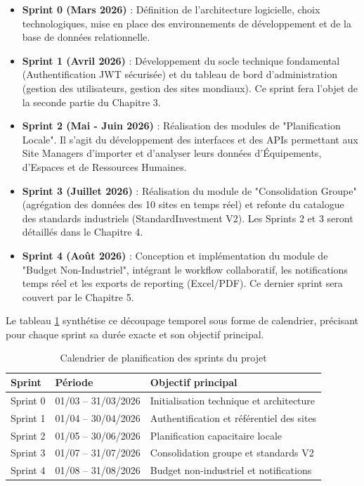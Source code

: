\begin{itemize}
    \item \textbf{Sprint 0 (Mars 2026)} : Définition de l'architecture logicielle, choix technologiques, mise en place des environnements de développement et de la base de données relationnelle.
    \item \textbf{Sprint 1 (Avril 2026)} : Développement du socle technique fondamental (Authentification JWT sécurisée) et du tableau de bord d'administration (gestion des utilisateurs, gestion des sites mondiaux). Ce sprint fera l'objet de la seconde partie du Chapitre 3.
    \item \textbf{Sprint 2 (Mai - Juin 2026)} : Réalisation des modules de "Planification Locale". Il s'agit du développement des interfaces et des APIs permettant aux Site Managers d'importer et d'analyser leurs données d'Équipements, d'Espaces et de Ressources Humaines. 
    \item \textbf{Sprint 3 (Juillet 2026)} : Réalisation du module de "Consolidation Groupe" (agrégation des données des 10 sites en temps réel) et refonte du catalogue des standards industriels (StandardInvestment V2). Les Sprints 2 et 3 seront détaillés dans le Chapitre 4.
    \item \textbf{Sprint 4 (Août 2026)} : Conception et implémentation du module de "Budget Non-Industriel", intégrant le workflow collaboratif, les notifications temps réel et les exports de reporting (Excel/PDF). Ce dernier sprint sera couvert par le Chapitre 5.
\end{itemize}

Le tableau \ref{tab:planning_sprints} synthétise ce découpage temporel sous forme de calendrier, précisant pour chaque sprint sa durée exacte et son objectif principal.

\begin{table}[h]
\centering
\begin{tabular}{|l|p{3.2cm}|p{7.5cm}|}
\hline
\textbf{Sprint} & \textbf{Période} & \textbf{Objectif principal} \\ \hline
Sprint 0 & 01/03 -- 31/03/2026 & Initialisation technique et architecture \\ \hline
Sprint 1 & 01/04 -- 30/04/2026 & Authentification et référentiel des sites \\ \hline
Sprint 2 & 01/05 -- 30/06/2026 & Planification capacitaire locale \\ \hline
Sprint 3 & 01/07 -- 31/07/2026 & Consolidation groupe et standards V2 \\ \hline
Sprint 4 & 01/08 -- 31/08/2026 & Budget non-industriel et notifications \\ \hline
\end{tabular}
\caption{Calendrier de planification des sprints du projet}
\label{tab:planning_sprints}
\end{table}

